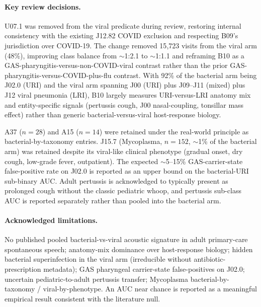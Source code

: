\documentclass[utf8]{frontiers_suppmat} %
\begin{document}
\paragraph{Key review decisions.} U07.1 was removed from the viral
predicate during review, restoring internal consistency with the
existing J12.82 COVID exclusion and respecting B09's
jurisdiction over COVID-19. The change removed 15{,}723 visits from
the viral arm (48\%), improving class balance
from $\sim$1:2.1 to $\sim$1:1.1 and reframing B10 as a
GAS-pharyngitis-versus-non-COVID-viral contrast rather than the prior
GAS-pharyngitis-versus-COVID-plus-flu contrast. With 92\% of the
bacterial arm being J02.0 (URI) and the viral arm spanning J00 (URI)
plus J09--J11 (mixed) plus J12 viral pneumonia (LRI), B10 largely
measures URI-versus-LRI anatomy mix and entity-specific signals
(pertussis cough, J00 nasal-coupling, tonsillar mass effect) rather
than generic bacterial-versus-viral host-response biology.

A37 ($n=28$) and A15 ($n=14$) were retained under the real-world
principle as bacterial-by-taxonomy entries. J15.7 (Mycoplasma,
$n=152$, $\sim$1\% of the bacterial arm) was retained despite its
viral-like clinical phenotype (gradual onset, dry cough, low-grade
fever, outpatient). The expected
$\sim$5--15\% GAS-carrier-state false-positive rate on J02.0 is
reported as an upper bound on the bacterial-URI sub-binary AUC.
Adult pertussis is acknowledged to typically present as prolonged
cough without the classic pediatric whoop, and pertussis sub-class
AUC is reported separately rather than pooled into the bacterial
arm.

\paragraph{Acknowledged limitations.} No published pooled
bacterial-vs-viral acoustic signature in adult primary-care spontaneous
speech; anatomy-mix dominance over host-response biology; hidden
bacterial superinfection in the viral arm (irreducible without
antibiotic-prescription metadata); GAS pharyngeal carrier-state
false-positives on J02.0; uncertain pediatric-to-adult pertussis
transfer; Mycoplasma bacterial-by-taxonomy / viral-by-phenotype. An
AUC near chance is reported as a meaningful empirical result
consistent with the literature null.


\end{document}
